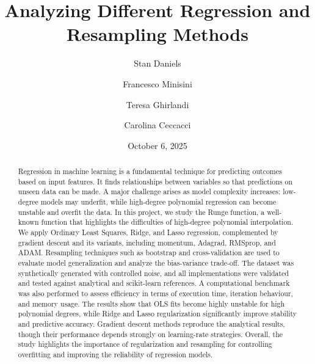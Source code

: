 \documentclass[
 reprint,            %
 amsmath,amssymb,
 aps,
]{revtex4-2}
\begin{document}
\raggedbottom

\title{Analyzing Different Regression and Resampling Methods}

\author{Stan Daniels}
\author{Francesco Minisini}
\author{Teresa Ghirlandi}
\author{Carolina Ceccacci}

\date{October 6, 2025}

\begin{abstract}
Regression in machine learning is a fundamental technique for predicting outcomes based on input features. It finds relationships between variables so that predictions on unseen data can be made. 
A major challenge arises as model complexity increases:  low-degree models may underfit, while high-degree polynomial regression can become unstable and overfit the data. 
In this project, we study the Runge function, a well-known function that highlights the difficulties of high-degree polynomial interpolation. We apply Ordinary Least Squares, Ridge, and Lasso regression, complemented by gradient descent and its variants, including momentum, Adagrad, RMSprop, and ADAM. Resampling techniques such as bootstrap and cross-validation are used to evaluate model generalization and analyze the bias-variance trade-off.
The dataset was synthetically generated with controlled noise, and all implementations were validated and tested against analytical and scikit-learn references. A computational benchmark was also performed to assess efficiency in terms of execution time, iteration behaviour, and memory usage.
The results show that OLS fits become highly unstable for high polynomial degrees, while Ridge and Lasso regularization significantly improve stability and predictive accuracy. Gradient descent methods reproduce the analytical results, though their performance depends strongly on learning-rate strategies. Overall, the study highlights the importance of regularization and resampling for controlling overfitting and improving the reliability of regression models.
\end{abstract}

\maketitle
\end{document}
